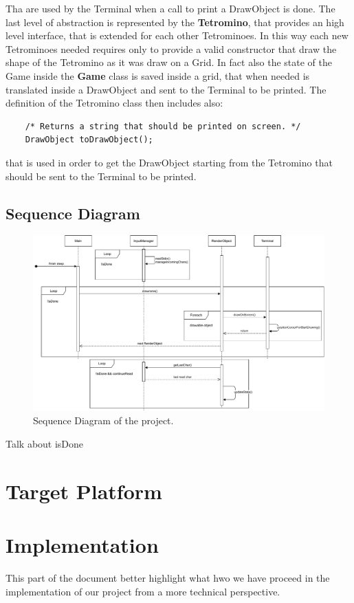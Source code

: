 \documentclass{article}
\begin{document}
Tha are used by the Terminal when a call to print a DrawObject is done.
The last level of abstraction is represented by the \textbf{Tetromino}, that provides an high level interface, that is extended for each other Tetrominoes. In this way each new Tetrominoes needed requires only to provide a valid constructor that draw the shape of the Tetromino as it was draw on a Grid.
In fact also the state of the Game inside the \textbf{Game} class is saved inside a grid, that when needed is translated inside a DrawObject and sent to the Terminal to be printed.
The definition of the Tetromino class then includes also:
\begin{verbatim}
    /* Returns a string that should be printed on screen. */
    DrawObject toDrawObject();
\end{verbatim}
that is used in order to get the DrawObject starting from the Tetromino that should be sent to the Terminal to be printed.

\subsection{Sequence Diagram}
\begin{figure}[H]
    \centering
    \includegraphics[width=\linewidth]{img/SequenceDiagram.pdf}
    \caption{Sequence Diagram of the project.}
    \label{fig:sequence}
\end{figure}
Talk about isDone

\section{Target Platform}

\section{Implementation}
This part of the document better highlight what hwo we have proceed in the implementation of our project from a more technical perspective.
\end{document}

